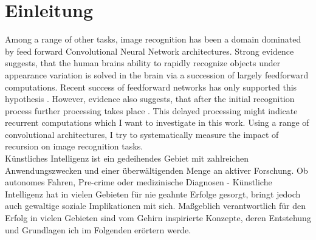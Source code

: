 \section{Einleitung}\label{Einleitung}
Among a range of other tasks, image recognition has been a domain dominated by feed forward Convolutional Neural Network architectures. Strong evidence suggests, that the human brains ability to rapidly recognize objects under appearance variation is solved in the brain via a succession of largely feedforward computations. \cite[2012]{DICARLO2012415} Recent success of feedforward networks has only supported this hypothesis \cite{NIPS2012_4824}. However, evidence also suggests, that after the initial recognition process further processing takes place \cite{Sugase1999}. This delayed processing might indicate recurrent computations which I want to investigate in this work.
Using a range of convolutional architectures, I try to systematically measure the impact of recursion on image recognition tasks.
\\
Künstliches Intelligenz ist ein gedeihendes Gebiet mit zahlreichen Anwendungszwecken und einer überwältigenden Menge an aktiver Forschung. Ob autonomes Fahren, Pre-crime oder medizinische Diagnosen - Künstliche Intelligenz hat in vielen Gebieten für nie geahnte Erfolge gesorgt, bringt jedoch auch gewaltige soziale Implikationen mit sich. Maßgeblich verantwortlich für den Erfolg in vielen Gebieten sind vom Gehirn inspirierte Konzepte, deren Entstehung und Grundlagen ich im Folgenden erörtern werde.